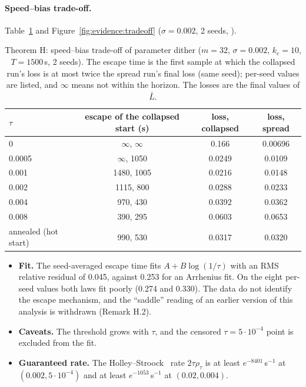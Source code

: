 \paragraph{Speed--bias trade-off.} Table~\ref{tab:evidence:tradeoff} and Figure~\ref{fig:evidence:tradeoff}
($\sigma=0.002$, 2 seeds, ).

\begin{table}[htbp]
\centering
\small
\caption{Theorem H: speed--bias trade-off of parameter dither ($m=32$, $\sigma=0.002$, $k_e=10$, $T=1500$\,s,
2 seeds). The escape time is the first sample at which the collapsed run's loss is at most twice the spread run's
final loss (same seed); per-seed values are listed, and $\infty$ means not within the horizon. The losses are the
final values of $\bar L$.}
\label{tab:evidence:tradeoff}
\begin{tabular}{@{}lccc@{}}
\toprule
$\tau$ & escape of the collapsed start (s) & loss, collapsed & loss, spread\\
\midrule
0                    & $\infty$, $\infty$ & 0.166  & 0.00696\\
0.0005               & $\infty$, 1050     & 0.0249 & 0.0109\\
0.001                & 1480, 1005         & 0.0216 & 0.0148\\
0.002                & 1115, 800          & 0.0288 & 0.0233\\
0.004                & 970, 430           & 0.0392 & 0.0362\\
0.008                & 390, 295           & 0.0603 & 0.0653\\
annealed (hot start) & 990, 530           & 0.0317 & 0.0320\\
\bottomrule
\end{tabular}
\end{table}

\begin{itemize}
  \item \textbf{Fit.} The seed-averaged escape time fits $A+B\log(1/\tau)$ with an RMS relative residual of 0.045,
    against 0.253 for an Arrhenius fit. On the eight per-seed values both laws fit poorly (0.274 and 0.330). The
    data do not identify the escape mechanism, and the ``saddle'' reading of an earlier version of this analysis is
    withdrawn (Remark H.2).
  \item \textbf{Caveats.} The threshold grows with $\tau$, and the censored $\tau=5\cdot10^{-4}$ point is excluded
    from the fit.
  \item \textbf{Guaranteed rate.} The Holley--Stroock~\cite{hs1987} rate $2\tau\rho_\tau$ is at least
    $e^{-8401}$\,s$^{-1}$ at $(0.002,5\cdot10^{-4})$ and at least $e^{-1053}$\,s$^{-1}$ at $(0.02,0.004)$.
\end{itemize}

